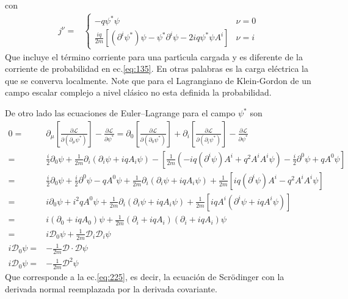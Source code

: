 con
\begin{align*}
  j^\nu=&
  \begin{cases}
    -q \psi^*\psi &\nu=0\\
    \frac{i q}{2m}[ (\partial^i\psi^*)\psi-\psi^*\partial^i\psi-2i{q}\psi^*\psi A^i]&\nu=i
  \end{cases}
\end{align*}
Que incluye el t\'ermino corriente para una part\'\i cula cargada y es diferente de la corriente de probabilidad en ec.\eqref{eq:135}. En otras palabras es la carga el\'ectrica la que se converva localmente. Note que para el Lagrangiano de Klein-Gordon de un campo escalar complejo a nivel cl\'asico no esta definida la probabilidad. 

De otro lado las ecuaciones de Euler--Lagrange para el campo $\psi^*$ son
\begin{align}
0=&\partial_\mu\left[\frac{\partial\mathcal{L}}{\partial\left(\partial_\mu\psi^*\right)}\right]-\frac{\partial\mathcal{L}}{\partial\psi^*}=
\partial_0\left[\frac{\partial\mathcal{L}}{\partial\left(\partial_0\psi^*\right)}\right]+\partial_i\left[\frac{\partial\mathcal{L}}{\partial\left(\partial_i\psi^*\right)}\right]-\frac{\partial\mathcal{L}}{\partial\psi^*}\nonumber\\
  =&\frac{i}{2}\partial_0\psi
  +\frac{1}{2m}\partial_i\left(\partial_i\psi+i q A_i\psi\right)
  -\left[\frac{1}{2m}\left(-i q (\partial^i\psi)A^i+q^2A^i A^i\psi\right)
    -\frac{i}{2}\partial^0\psi+q A^0\psi\right]\nonumber\\
   =&\frac{i}{2}\partial_0\psi+\frac{i}{2}\partial^0\psi-q A^0\psi
  +\frac{1}{2m}\partial_i\left(\partial_i\psi+i q A_i\psi\right)
  +\frac{1}{2m}\left[i q (\partial^i\psi)A^i-q^2A^i A^i\psi\right]\nonumber\\
   =&i\partial_0\psi+i^2q A^0\psi
  +\frac{1}{2m}\partial_i\left(\partial_i\psi+i q A_i\psi\right)
  +\frac{1}{2m}\left[i q A^i (\partial^i\psi+i q A^i\psi )\right]\nonumber\\
   =&i(\partial_0+iq A_0)\psi
  +\frac{1}{2m}\left(\partial_i+i q A_i\right)\left(\partial_i+i q A_i\right)\psi\nonumber\\
   =&i\mathcal{D}_0\psi
  +\frac{1}{2m}\mathcal{D}_i\mathcal{D}_i\psi\nonumber\\
i\mathcal{D}_0\psi=&-\frac{1}{2m}\boldsymbol{\mathcal{D}}\cdot\boldsymbol{\mathcal{D}}\psi\nonumber\\
i\mathcal{D}_0\psi=&-\frac{1}{2m}\boldsymbol{\mathcal{D}}^2\psi\nonumber
\end{align}
Que corresponde a la ec.\eqref{eq:225}, es decir, la ecuaci\'on de Scr\"odinger con la derivada normal reemplazada por la derivada covariante.

